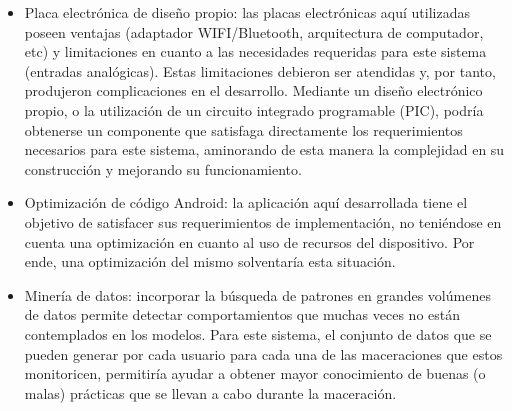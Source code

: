 \begin{itemize}
    \item Placa electrónica de diseño propio: las placas electrónicas aquí utilizadas poseen ventajas (adaptador WIFI/Bluetooth, arquitectura de computador, etc) y limitaciones  en cuanto a las necesidades requeridas para este sistema (entradas analógicas). Estas limitaciones debieron ser atendidas y, por tanto, produjeron complicaciones en el desarrollo. Mediante un diseño electrónico propio, o la utilización de un circuito integrado programable (PIC), podría obtenerse un componente que satisfaga directamente los requerimientos necesarios para este sistema, aminorando de esta manera la complejidad en su construcción y mejorando su funcionamiento.
    
    \item Optimización de código Android: la aplicación aquí desarrollada tiene el objetivo de satisfacer sus requerimientos de implementación, no teniéndose en cuenta una optimización en cuanto al uso de recursos del dispositivo. Por ende, una optimización del mismo solventaría esta situación.
    
    \item Minería de datos: incorporar la búsqueda de patrones en grandes volúmenes de datos permite detectar comportamientos que muchas veces no están contemplados en los modelos. Para este sistema, el conjunto de datos que se pueden generar por cada usuario para cada una de las maceraciones que estos monitoricen, permitiría ayudar a obtener mayor conocimiento de buenas (o malas) prácticas que se llevan a cabo durante la maceración. 
    
    
\end{itemize}

\clearpage